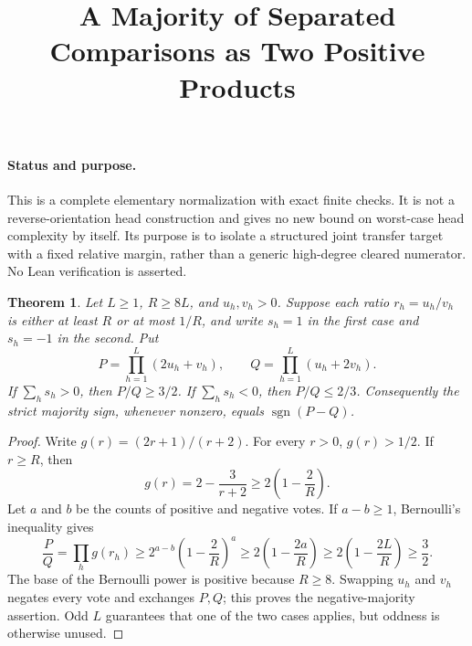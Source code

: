 \documentclass[11pt]{article}
\title{A Majority of Separated Comparisons as Two Positive Products}
\author{}\date{}
\newtheorem{theorem}{Theorem}
\begin{document}
\maketitle
\paragraph{Status and purpose.}
This is a complete elementary normalization with exact finite checks.
It is not a reverse-orientation head construction and gives no new
bound on worst-case head complexity by itself. Its purpose is to
isolate a structured joint transfer target with a fixed relative
margin, rather than a generic high-degree cleared numerator.
No Lean verification is asserted.

\begin{theorem}
Let $L\geq1$, $R\geq8L$, and $u_h,v_h>0$. Suppose each ratio
$r_h=u_h/v_h$ is either at least $R$ or at most $1/R$, and write
$s_h=1$ in the first case and $s_h=-1$ in the second. Put
\[
 P=\prod_{h=1}^L(2u_h+v_h),\qquad
 Q=\prod_{h=1}^L(u_h+2v_h).
\]
If $\sum_hs_h>0$, then $P/Q\geq3/2$. If $\sum_hs_h<0$,
then $P/Q\leq2/3$. Consequently the strict majority sign, whenever
nonzero, equals $\operatorname{sgn}(P-Q)$.
\end{theorem}
\begin{proof}
Write $g(r)=(2r+1)/(r+2)$. For every $r>0$, $g(r)>1/2$.
If $r\geq R$, then
\[
 g(r)=2-\frac3{r+2}\geq2\left(1-\frac2R\right).
\]
Let $a$ and $b$ be the counts of positive and negative votes.
If $a-b\geq1$, Bernoulli's inequality gives
\[
 \frac P Q=\prod_hg(r_h)
 \geq2^{a-b}\left(1-\frac2R\right)^a
 \geq2\left(1-\frac{2a}R\right)
 \geq2\left(1-\frac{2L}R\right)\geq\frac32.
\]
The base of the Bernoulli power is positive because $R\geq8$.
Swapping $u_h$ and $v_h$ negates every vote and exchanges $P,Q$;
this proves the negative-majority assertion. Odd $L$ guarantees
that one of the two cases applies, but oddness is otherwise unused.
\end{proof}
\end{document}
